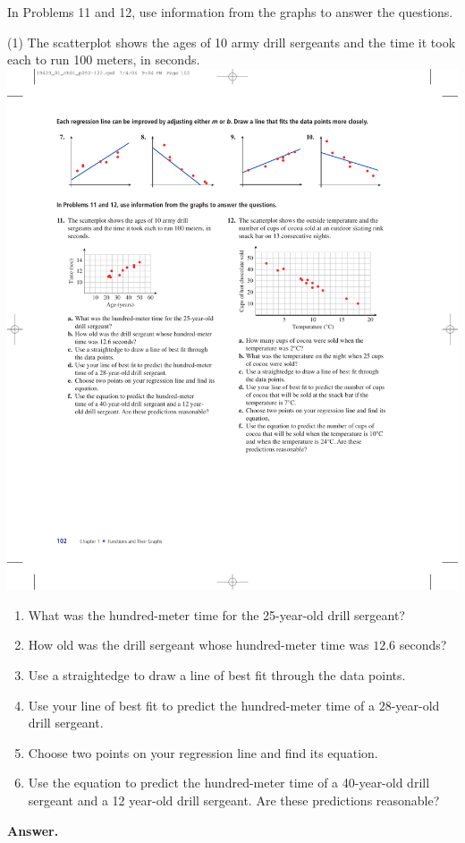 \documentclass[10pt,]{book}
\theoremstyle{plain}
\theoremstyle{definition}
\theoremstyle{definition}
\theoremstyle{definition}
\theoremstyle{definition}
\numberwithin{equation}{part}
\begin{document}
\par\smallskip\noindent
\hypertarget{exercisegroup-48}{}\par\noindent In Problems 11 and 12, use information from the graphs to answer the questions.%
\begin{exercisegroup}(1)
\exercise[11.]\hypertarget{exercise-367}{}The scatterplot shows the ages of 10 army drill sergeants and the time it took each to run 100 meters, in seconds. \includegraphics[width=0.5\linewidth]{images/fig-ex-1-6-11}
 \leavevmode%
\begin{enumerate}[label=*\alph**]
\item\hypertarget{li-1369}{}What was the hundred-meter time for the 25-year-old drill sergeant?%
\item\hypertarget{li-1370}{}How old was the drill sergeant whose hundred-meter time was \(12.6\) seconds?%
\item\hypertarget{li-1371}{}Use a straightedge to draw a line of best fit through the data points.%
\item\hypertarget{li-1372}{}Use your line of best fit to predict the hundred-meter time of a \(28\)-year-old drill sergeant.%
\item\hypertarget{li-1373}{}Choose two points on your regression line and find its equation.%
\item\hypertarget{li-1374}{}Use the equation to predict the hundred-meter time of a 40-year-old drill sergeant and a 12 year-old drill sergeant. Are these predictions reasonable?%
\end{enumerate}
%
\par\smallskip
\noindent\textbf{Answer.}\hypertarget{answer-207}{}\quad
\leavevmode%
\begin{multicols}{2}
\begin{enumerate}[label=*\alph**]

\end{enumerate}
\end{multicols}
\end{exercisegroup}
\end{document}
